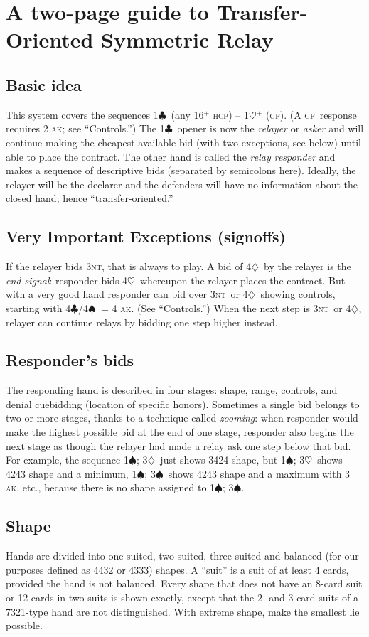 \documentclass{amsart}
\newcommand{\hcp}{\textsc{hcp}}
\newcommand{\ak}{\textsc{ak}}
\newcommand{\gf}{\textsc{gf}}
\renewcommand{\c}{\ensuremath{\clubsuit}}
\renewcommand{\d}{\ensuremath{\diamondsuit}}
\newcommand{\h}{\ensuremath{\heartsuit}}
\newcommand{\s}{\ensuremath{\spadesuit}}
\newcommand{\nt}{\textsc{nt}}
\newcommand{\+}{\ensuremath{^+}}
\begin{document}
\section*{A two-page guide to Transfer-Oriented Symmetric Relay}

\subsection*{Basic idea}
This system covers the sequences 1\c\ (any 16\+ \hcp) -- 1\h\+ (\gf).
(A \gf\ response requires 2 \ak; see ``Controls.'')  The 1\c\ opener
is now the \emph{relayer} or \emph{asker} and will continue making the
cheapest available bid (with two exceptions, see below) until able to
place the contract.  The other hand is called the \emph{relay
  responder} and makes a sequence of descriptive bids (separated by
semicolons here).  Ideally, the relayer will be the declarer and the
defenders will have no information about the closed hand; hence
``transfer-oriented.''

\subsection*{Very Important Exceptions (signoffs)}
If the relayer bids 3\nt, that is always to play.  A bid of 4\d\ by
the relayer is the \emph{end signal}: responder bids 4\h\ whereupon
the relayer places the contract.  But with a very good hand responder
can bid over 3\nt\ or 4\d\ showing controls, starting with 4\c/4\s\ =
4 \ak.  (See ``Controls.'')  When the next step is 3\nt\ or 4\d,
relayer can continue relays by bidding one step higher instead.

\subsection*{Responder's bids}
The responding hand is described in four stages: shape, range,
controls, and denial cuebidding (location of specific honors).
Sometimes a single bid belongs to two or more stages, thanks to a
technique called \emph{zooming}: when responder would make the highest
possible bid at the end of one stage, responder also begins the next
stage as though the relayer had made a relay ask one step below that
bid.  For example, the sequence 1\s; 3\d\ just shows 3424 shape, but
1\s; 3\h\ shows 4243 shape and a minimum, 1\s; 3\s\ shows 4243 shape
and a maximum with 3 \ak, etc., because there is no shape assigned to
1\s; 3\s.

\subsection*{Shape}
Hands are divided into one-suited, two-suited, three-suited and
balanced (for our purposes defined as 4432 or 4333) shapes.  A
``suit'' is a suit of at least 4 cards, provided the hand is not
balanced.  Every shape that does not have an 8-card suit or 12 cards
in two suits is shown exactly, except that the 2- and 3-card suits of
a 7321-type hand are not distinguished.  With extreme shape, make the
smallest lie possible.
\end{document}
